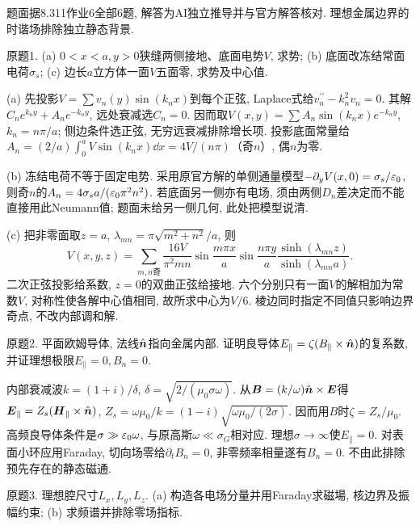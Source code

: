 题面据8.311作业6全部6题, 解答为AI独立推导并与官方解答核对. 理想金属边界的时谐场排除独立静态背景.
\begin{exercise}
原题1. (a) $0<x<a,y>0$狭缝两侧接地、底面电势$V$, 求势; (b) 底面改冻结常面电荷$\sigma_s$; (c) 边长$a$立方体一面$V$五面零, 求势及中心值.
\end{exercise}
\begin{solution}
(a) 先投影$V=\sum v_n(y)\sin(k_nx)$到每个正弦, Laplace式给$v_n^{\prime\prime}-k_n^2v_n=0$. 其解$C_ne^{k_ny}+A_ne^{-k_ny}$, 远处衰减选$C_n=0$. 因而取$V(x,y)=\sum A_n\sin(k_nx)e^{-k_ny}$, $k_n=n\pi/a$; 侧边条件选正弦, 无穷远衰减排除增长项. 投影底面常量给$A_n=(2/a)\int_0^aV\sin(k_nx)\dd x=4V/(n\pi)$（奇$n$）, 偶$n$为零.

(b) 冻结电荷不等于固定电势. 采用原官方解的单侧通量模型$-\partial_yV(x,0)=\sigma_s/\varepsilon_0$, 则奇$n$的$A_n=4\sigma_sa/(\varepsilon_0\pi^2n^2)$. 若底面另一侧亦有电场, 须由两侧$D_n$差决定而不能直接用此Neumann值; 题面未给另一侧几何, 此处把模型说清.

(c) 把非零面取$z=a$, $\lambda_{mn}=\pi\sqrt{m^2+n^2}/a$, 则
\[
V(x,y,z)=\sum_{m,n\text{奇}}\frac{16V}{\pi^2mn}\sin\frac{m\pi x}a\sin\frac{n\pi y}a\frac{\sinh(\lambda_{mn}z)}{\sinh(\lambda_{mn}a)}.
\] 二次正弦投影给系数, $z=0$的双曲正弦给接地. 六个分别只有一面$V$的解相加为常数$V$, 对称性使各解中心值相同, 故所求中心为$V/6$. 棱边同时指定不同值只影响边界奇点, 不改内部调和解.
\end{solution}
\begin{exercise}
原题2. 平面欧姆导体, 法线$\hat{\boldsymbol{n}}$指向金属内部. 证明良导体$E_\parallel=\zeta(B_\parallel\times\hat{\boldsymbol{n}})$的复系数, 并证理想极限$E_\parallel=0,B_n=0$.
\end{exercise}
\begin{solution}
内部衰减波$k=(1+i)/\delta$, $\delta=\sqrt{2/(\mu_0\sigma\omega)}$. 从$\boldsymbol{B}=(k/\omega)\hat{\boldsymbol{n}}\times\boldsymbol{E}$得$\boldsymbol{E}_\parallel=Z_s(\boldsymbol{H}_\parallel\times\hat{\boldsymbol{n}})$, $Z_s=\omega\mu_0/k=(1-i)\sqrt{\omega\mu_0/(2\sigma)}$. 因而用$B$时$\zeta=Z_s/\mu_0$. 高频良导体条件是$\sigma\gg\varepsilon_0\omega$, 与原高斯$\omega\ll\sigma_G$相对应. 理想$\sigma\to\infty$使$E_\parallel=0$. 对表面小环应用Faraday, 切向场零给$\partial_tB_n=0$, 非零频率相量遂有$B_n=0$. 不由此排除预先存在的静态磁通.
\end{solution}
\begin{exercise}
原题3. 理想腔尺寸$L_x,L_y,L_z$. (a) 构造各电场分量并用Faraday求磁場, 核边界及振幅约束; (b) 求频谱并排除零场指标.
\end{exercise}
